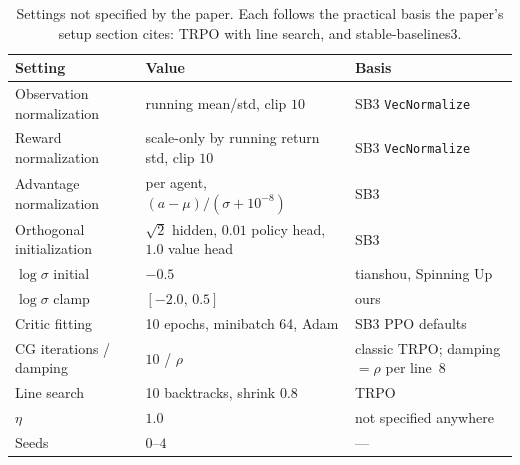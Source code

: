\begin{table}[t]
  \centering
  \caption{Settings not specified by the paper. Each follows the practical
  basis the paper's setup section cites: TRPO with line search, and
  stable-baselines3.}
  \label{tab:ours}
  \begin{tabular}{lll}
    \toprule
    Setting & Value & Basis \\
    \midrule
    Observation normalization & running mean/std, clip $10$ & SB3 \texttt{VecNormalize} \\
    Reward normalization      & scale-only by running return std, clip $10$ & SB3 \texttt{VecNormalize} \\
    Advantage normalization   & per agent, $(a-\mu)/(\sigma+10^{-8})$ & SB3 \\
    Orthogonal initialization & $\sqrt{2}$ hidden, $0.01$ policy head, $1.0$ value head & SB3 \\
    $\log\sigma$ initial      & $-0.5$ & tianshou, Spinning Up \\
    $\log\sigma$ clamp        & $[-2.0,\, 0.5]$ & ours \\
    Critic fitting            & 10 epochs, minibatch 64, Adam & SB3 PPO defaults \\
    CG iterations / damping   & $10$ / $\rho$ & classic TRPO; damping $=\rho$ per line~8 \\
    Line search               & 10 backtracks, shrink $0.8$ & TRPO \\
    $\eta$                    & $1.0$ & not specified anywhere \\
    Seeds                     & $0$--$4$ & --- \\
    \bottomrule
  \end{tabular}
\end{table}
